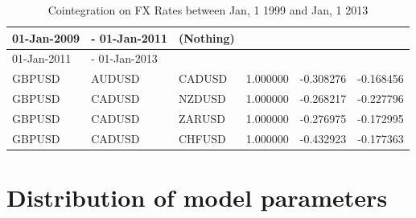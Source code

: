 \documentclass[11pt,a4,twosided,singlespacing,titlepagenumber=on]{scrreprt}
\numberwithin{equation}{chapter} %
\theoremstyle{remark}
\begin{document}
\begin{table}[H]
\begin{tabular}{llllll}
\hline
01-Jan-2009 &- 01-Jan-2011 &  (Nothing)\\
\hline
01-Jan-2011 &- 01-Jan-2013\\
\hline
GBPUSD & AUDUSD & CADUSD & 1.000000& -0.308276& -0.168456 \\
GBPUSD & CADUSD & NZDUSD & 1.000000& -0.268217& -0.227796 \\
GBPUSD & CADUSD & ZARUSD & 1.000000& -0.276975& -0.172995 \\
GBPUSD & CADUSD & CHFUSD & 1.000000& -0.432923& -0.177363 \\
\hline
\end{tabular}
\caption{Cointegration on FX Rates between Jan, 1 1999 and Jan, 1 2013}
\label{coint_fx}
\end{table}

\section{Distribution of model parameters}
\label{app:distribution_model_parameters_m7}
\end{document}
